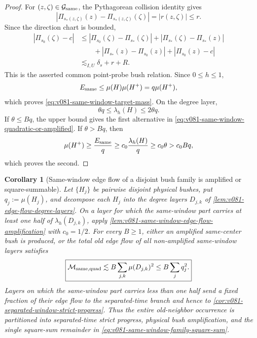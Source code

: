 \documentclass[10pt]{article}
\newtheorem{corollary}[theorem]{Corollary}
\begin{document}
\begin{proof}
For \((z,\zeta)\in\mathcal G_{\rm same}\), the Pythagorean collision identity gives
\[
|\Pi_{s_*(z,\zeta)}(z)-\Pi_{s_*(z,\zeta)}(\zeta)|
=
|r(z,\zeta)|
\le r.
\]
Since the direction chart is bounded,
\[
\begin{aligned}
|\Pi_{s_0}(\zeta)-c|
&\le
|\Pi_{s_0}(\zeta)-\Pi_{s_*}(\zeta)|
+|\Pi_{s_*}(\zeta)-\Pi_{s_*}(z)|\\
&\qquad
+|\Pi_{s_*}(z)-\Pi_{s_0}(z)|
+|\Pi_{s_0}(z)-c|\\
&\lesssim_{I,U}
\delta_s+r+R.
\end{aligned}
\]
This is the asserted common point-probe bush relation.  Since \(0\le h\le1\),
\[
E_{\rm same}
\le
\mu(H)\mu(H^+)
=
q\mu(H^+),
\]
which proves \eqref{eq:v081-same-window-target-mass}.  On the degree layer,
\[
\theta q\le\lambda_h(H)\le2\theta q.
\]
If \(\theta\le Bq\), the upper bound gives the first alternative in
\eqref{eq:v081-same-window-quadratic-or-amplified}.  If \(\theta>Bq\), then
\[
\mu(H^+)
\ge
\frac{E_{\rm same}}q
\ge
c_0\frac{\lambda_h(H)}q
\ge
c_0\theta
>
c_0Bq,
\]
which proves the second.
\end{proof}

\begin{corollary}[Same-window edge flow of a disjoint bush family is amplified or square-summable]
\label{cor:v081-same-window-family-square-sum}
Let \(\{H_j\}\) be pairwise disjoint physical bushes, put \(q_j:=\mu(H_j)\), and decompose each
\(H_j\) into the degree layers \(D_{j,k}\) of
\cref{lem:v081-edge-flow-degree-layers}.  On a layer for which the same-window part carries at least
one half of \(\lambda_h(D_{j,k})\), apply
\cref{lem:v081-same-window-edge-flow-amplification} with \(c_0=1/2\).  For every \(B\ge1\), either
an amplified same-center bush is produced, or the total old edge flow of all non-amplified
same-window layers satisfies
\begin{equation}
\label{eq:v081-same-window-family-square-sum}
\boxed{
\mathcal M_{\rm same,quad}
\lesssim
B\sum_{j,k}\mu(D_{j,k})^2
\le
B\sum_jq_j^2.
}
\end{equation}
Layers on which the same-window part carries less than one half send a fixed fraction of their
edge flow to the separated-time branch and hence to
\cref{cor:v081-separated-window-strict-progress}.  Thus the entire old-neighbor occurrence is
partitioned into separated-time strict progress, physical bush amplification, and the single
square-sum remainder in \eqref{eq:v081-same-window-family-square-sum}.
\end{corollary}
\end{document}
